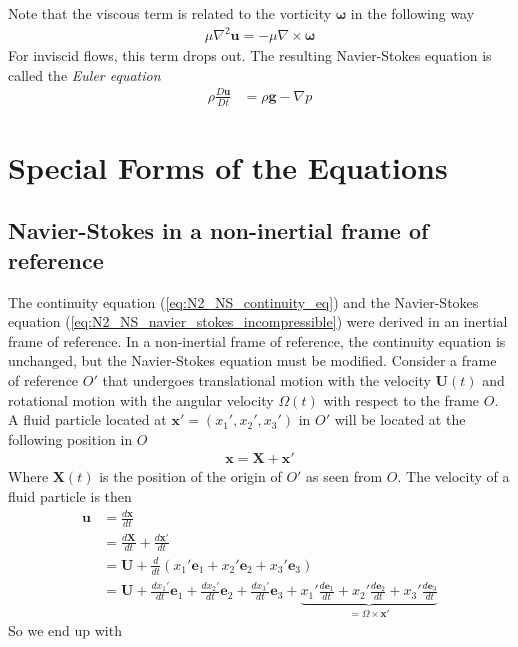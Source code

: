 \documentclass[a4paper, 12pt]{article}
\numberwithin{equation}{subsubsection}
\begin{document}
Note that the viscous term is related to the vorticity $\mathbf{\omega}$ in the following way
\begin{align}
	\mu \nabla^2 \mathbf{u} = - \mu \nabla \times \mathbf{\omega}
\end{align}
For inviscid flows, this term drops out. The resulting Navier-Stokes equation is called the \textit{Euler equation}
\begin{align}
	\rho \frac{D \mathbf{u}}{D t} &= \rho \mathbf{g} - \nabla p
\end{align}

\newpage
\section{Special Forms of the Equations}
\subsection{Navier-Stokes in a non-inertial frame of reference}
The continuity equation (\ref{eq:N2_NS_continuity_eq}) and the Navier-Stokes equation (\ref{eq:N2_NS_navier_stokes_incompressible}) were derived in an inertial frame of reference. In a non-inertial frame of reference, the continuity equation is unchanged, but the Navier-Stokes equation must be modified. Consider a frame of reference $O'$ that undergoes translational motion with the velocity $\mathbf{U}(t)$ and rotational motion with the angular velocity $\Omega (t)$ with respect to the frame $O$. A fluid particle located at $\mathbf{x}' = (x_1', x_2', x_3')$ in $O'$ will be located at the following position in $O$
\begin{align*}
	\mathbf{x} = \mathbf{X} + \mathbf{x}'
\end{align*}
Where $\mathbf{X}(t)$ is the position of the origin of $O'$ as seen from $O$. The velocity of a fluid particle is then
\begin{align*}
	\mathbf{u} &= \frac{d \mathbf{x}}{dt} \\
	&= \frac{d \mathbf{X}}{d t} + \frac{d \mathbf{x}'}{dt} \\
	&= \mathbf{U} + \frac{d}{dt} \left( x_1' \mathbf{e}_1 + x_2' \mathbf{e}_2 + x_3' \mathbf{e}_3 \right) \\
	&= \mathbf{U} + \frac{dx_1'}{dt} \mathbf{e}_1 + \frac{dx_2'}{dt} \mathbf{e}_2 + \frac{dx_3'}{dt} \mathbf{e}_3 + \underbrace{x_1' \frac{d \mathbf{e}_1}{dt} + x_2' \frac{d \mathbf{e}_2}{dt} + x_3' \frac{d \mathbf{e}_3}{dt}}_{=\Omega \times \mathbf{x}'}
\end{align*}
So we end up with
\end{document}

